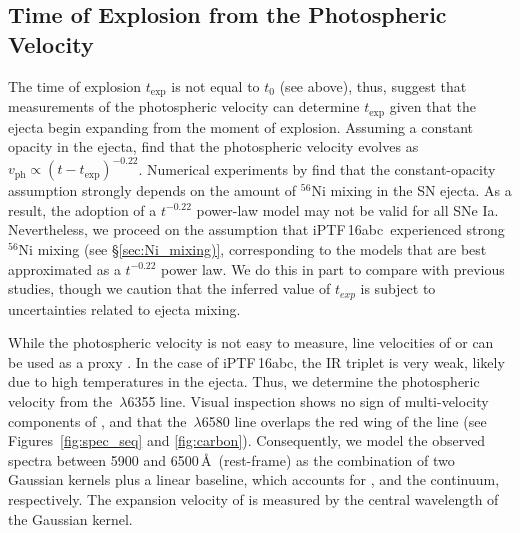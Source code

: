 \documentclass[twocolumn]{aastex61}
\newcommand{\abc}{iPTF\,16abc}
\begin{document}
\subsection{Time of Explosion from the Photospheric Velocity}
\label{sec:early_vel}

The time of explosion $t_\mathrm{exp}$ is not equal to $t_0$ (see
above), thus, \citet{2014ApJ...784...85P} suggest that measurements of the
photospheric velocity can determine $t_\mathrm{exp}$ given that the ejecta
begin expanding from the moment of explosion. Assuming a constant opacity in
the ejecta, \citeauthor{2014ApJ...784...85P} find that the photospheric
velocity evolves as $v_\mathrm{ph}\propto(t-t_\mathrm{exp})^{-0.22}$.
Numerical experiments by \citet{2016ApJ...826...96P} find that the
constant-opacity assumption strongly depends on the amount of $^{56}$Ni mixing
in the SN ejecta. As a result, the adoption of a $t^{-0.22}$ power-law model
may not be valid for all SNe Ia. Nevertheless, we proceed on the assumption
that \abc\ experienced strong $^{56}$Ni mixing (see
\S\ref{sec:Ni_mixing)}, corresponding to the models that are best
approximated as a $t^{-0.22}$ power law. We do this in part to compare with
previous studies, though we caution that the inferred value of $t_{exp}$ is
subject to uncertainties related to ejecta mixing.

While the photospheric velocity is not easy to measure, line velocities of
 or  can be used as a proxy
\citep{2014ApJ...784...85P,2016ApJ...826..144S}. In the case of \abc, the
 IR triplet is very weak, likely due to high temperatures in the
ejecta. Thus, we determine the photospheric velocity from the
\,$\lambda$6355 line. Visual inspection shows no sign of
multi-velocity components of , and that the
\,$\lambda$6580 line overlaps the red wing of the  line
(see Figures~\ref{fig:spec_seq} and \ref{fig:carbon}). Consequently, we model
the observed spectra between 5900 and 6500\,\AA\ (rest-frame) as the
combination of two Gaussian kernels plus a linear baseline, which accounts for
,  and the continuum, respectively. The expansion
velocity of  is measured by the central wavelength of the
 Gaussian kernel.
\end{document}
